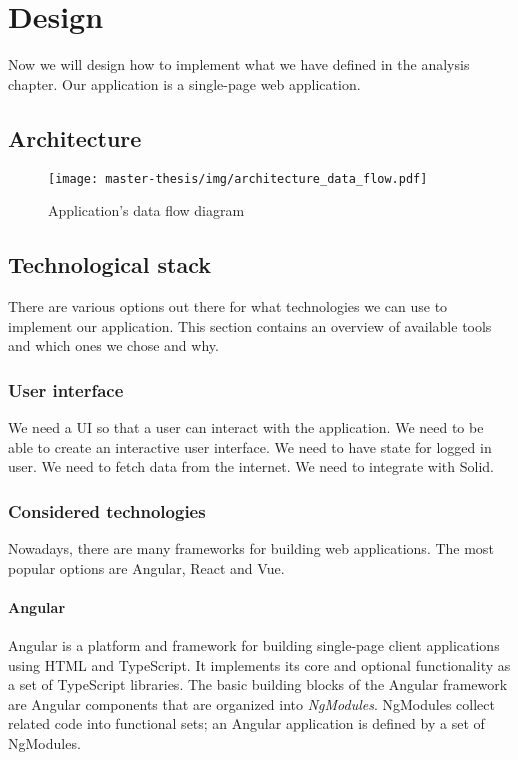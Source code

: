 \chapter{Design}
Now we will design how to implement what we have defined in the analysis chapter.
Our application is a single-page web application.

\section{Architecture}
\begin{figure}[h]
  \centering
  \texttt{[image: master-thesis/img/architecture\_data\_flow.pdf]}
  \caption{Application's data flow diagram}
\end{figure}


\section{Technological stack}
There are various options out there for what technologies we can use to implement our application.
This section contains an overview of available tools and which ones we chose and why.

\subsection{User interface}
  We need a UI so that a user can interact with the application.
  We need to be able to create an interactive user interface.
  We need to have state for logged in user.
  We need to fetch data from the internet.
  We need to integrate with Solid.

  \subsection*{Considered technologies}
  Nowadays, there are many frameworks for building web applications.
  The most popular options are Angular, React and Vue.

  \subsubsection*{Angular}
  Angular is a platform and framework for building single-page client applications using HTML and TypeScript. 
  It implements its core and optional functionality as a set of TypeScript libraries. 
  The basic building blocks of the Angular framework are Angular components that are organized into \emph{NgModules}. 
  NgModules collect related code into functional sets; an Angular application is defined by a set of NgModules.

